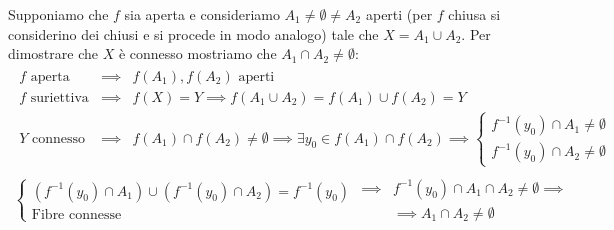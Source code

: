 \begin{demonstration}
	Supponiamo che $f$ sia aperta e consideriamo $A_1\neq\emptyset\neq A_2$ aperti (per $f$ chiusa si considerino dei chiusi e si procede in modo analogo) tale che $X=A_1\cup A_2$. Per dimostrare che $X$ è connesso mostriamo che $A_1\cap A_2\neq\emptyset$:
		\begin{gather*}
			\begin{array}{lcl}
				f \text{ aperta } & \implies & f(A_1), f(A_2) \text{ aperti}\\
				f \text{ suriettiva} & \implies & f(X)=Y \implies f(A_1\cup A_2)=f(A_1)\cup f(A_2)=Y \\
				Y \text{ connesso } & \implies & f(A_1)\cap f(A_2)\neq\emptyset \implies \exists y_0\in f(A_1)\cap f(A_2) \implies \begin{cases}
					f^{-1}(y_0) \cap A_1\neq \emptyset \\
					f^{-1}(y_0) \cap A_2\neq \emptyset
				\end{cases}
			\end{array} \\
				\begin{cases}
					\left( f^{-1}(y_0)\cap A_1 \right)\cup \left( f^{-1}(y_0)\cap A_2 \right)=f^{-1}(y_0) \\
					\text{Fibre connesse }
				\end{cases}
				 \begin{array}{ll}
				 	\implies& f^{-1}(y_0)\cap A_1\cap A_2\neq\emptyset\implies\\
				 	&\implies A_1\cap A_2\neq\emptyset
				 \end{array}
		\end{gather*}
\vspace{-3mm}
\end{demonstration}
\begin{theorema}
\end{theorema}
